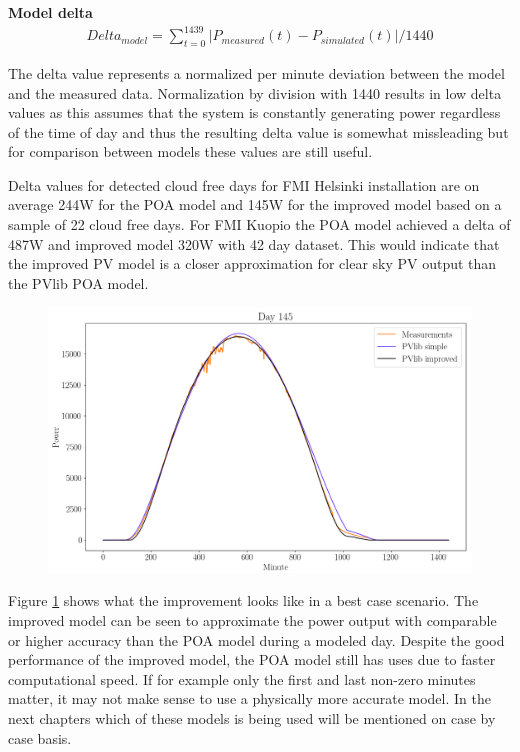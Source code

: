 \noindent\textbf{Model delta}
\begin{equation}
\begin{split}
\label{pv_model_delta}
Delta_{model} = \sum_{t=0}^{1439} |P_{measured}(t) - P_{simulated}(t)| /1440
\end{split}
\end{equation}

\noindent The delta value represents a normalized per minute deviation between the model and the measured data. Normalization by division with 1440 results in low delta values as this assumes that the system is constantly generating power regardless of the time of day and thus the resulting delta value is somewhat missleading but for comparison between models these values are still useful.


Delta values for detected cloud free days for FMI Helsinki installation are on average 244W for the POA model and 145W for the improved model based on a sample of 22 cloud free days. For FMI Kuopio the POA model achieved a delta of 487W and improved model 320W with 42 day dataset. This would indicate that the improved PV model is a closer approximation for clear sky PV output than the PVlib POA model.


\begin{figure}[h]
\centering
\includegraphics[width=0.99\linewidth]{pics/pvlibsimplecomplex}
\label{fig-poa_eval_simplecomplex}
\end{figure}

\noindent Figure \ref{fig-poa_eval_simplecomplex} shows what the improvement looks like in a best case scenario. The improved model can be seen to approximate the power output with comparable or higher accuracy than the POA model during a modeled day. Despite the good performance of the improved model, the POA model still has uses due to faster computational speed. If for example only the first and last non-zero minutes matter, it may not make sense to use a physically more accurate model. In the next chapters which of these models is being used will be mentioned on case by case basis.



